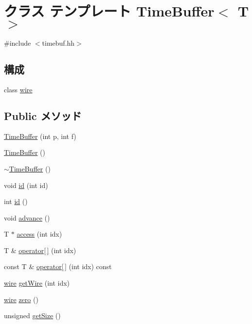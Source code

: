 \hypertarget{classTimeBuffer}{
\section{クラス テンプレート TimeBuffer$<$ T $>$}
\label{classTimeBuffer}
}


{\ttfamily \#include $<$timebuf.hh$>$}\subsection*{構成}
\begin{DoxyCompactItemize}
\item 
class \hyperlink{classTimeBuffer_1_1wire}{wire}
\end{DoxyCompactItemize}
\subsection*{Public メソッド}
\begin{DoxyCompactItemize}
\item 
\hyperlink{classTimeBuffer_afd7add7e4b5514997557fe25434baeeb}{TimeBuffer} (int p, int f)
\item 
\hyperlink{classTimeBuffer_ac346efdd68c85717035a34ec112482f3}{TimeBuffer} ()
\item 
\hyperlink{classTimeBuffer_a342883ccc8530e75c89a30b7f7c15c65}{$\sim$TimeBuffer} ()
\item 
void \hyperlink{classTimeBuffer_a7f3a9af2f60b21012f5dab71251b5b8f}{id} (int id)
\item 
int \hyperlink{classTimeBuffer_a4a716406d3d9d4fdbbe46f100e648f3b}{id} ()
\item 
void \hyperlink{classTimeBuffer_a8903a4e9f3d5fb42d0faa9d53e21d85c}{advance} ()
\item 
T $\ast$ \hyperlink{classTimeBuffer_a2c53cc1d80866083c0c997a6d685264a}{access} (int idx)
\item 
T \& \hyperlink{classTimeBuffer_a2a322a02b87eab70bf5d7d1f6e1b8842}{operator\mbox{[}$\,$\mbox{]}} (int idx)
\item 
const T \& \hyperlink{classTimeBuffer_a21e58a4115e3fe476f7a6677c14c54fa}{operator\mbox{[}$\,$\mbox{]}} (int idx) const 
\item 
\hyperlink{classTimeBuffer_1_1wire}{wire} \hyperlink{classTimeBuffer_ab1c801fd9d022ce4339cc62f4a0625dd}{getWire} (int idx)
\item 
\hyperlink{classTimeBuffer_1_1wire}{wire} \hyperlink{classTimeBuffer_ac9013d17b3e47b57b9b3c1bee98b218e}{zero} ()
\item 
unsigned \hyperlink{classTimeBuffer_a28ce3e44c8a6c2d60bb4c4837356c3b4}{getSize} ()
\end{DoxyCompactItemize}
